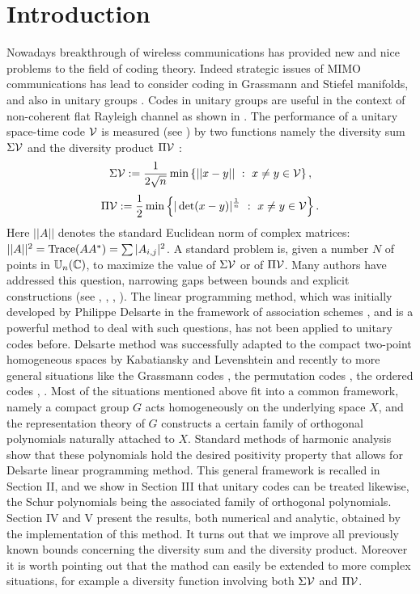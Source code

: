 \documentclass[10pt]{article}
\begin{document}
\section{Introduction}
Nowadays breakthrough of wireless communications has provided new and nice 
 problems to the field of coding theory. Indeed strategic issues of MIMO communications has
 lead to consider coding in Grassmann and Stiefel manifolds, and also
 in unitary groups \cite{TSE}.
 Codes in unitary groups  are useful in the context of non-coherent flat Rayleigh channel as shown
 in \cite{MARZETTA}. The performance of a unitary space-time code $\mathcal V$
 is measured  (see \cite{ROSEN}) by two functions namely the diversity sum $\Sigma \mathcal V$ and the 
 diversity product $\Pi \mathcal V$ : 
 \begin{eqnarray*}
 \Sigma \mathcal V := \frac{1}{2\sqrt{n}} \min \left \{ ||x-y||\ :
 \ x\ne y \in \mathcal V   \right\},
 \end{eqnarray*}
 \begin{eqnarray*}
 \Pi \mathcal V := \frac{1}{2} \min \left \{ |\det(x-y)|^{\frac 1 n}\ :
 \ x\ne y \in \mathcal V \right\}.
 \end{eqnarray*}
Here $||A||$ denotes the standard Euclidean norm of complex matrices: $||A||^2=\textrm{Trace}(AA^*)=\sum|A_{i,j}|^2$.
A standard problem is, given a  number $N$ of points in
$\mathbb{U}_n(\mathbb{C})$, to maximize the value of $\Sigma \mathcal V$ or of $\Pi \mathcal V$.
Many authors have addressed this question,
 narrowing gaps between bounds and explicit constructions (see
 \cite{ROSEN}, \cite{AB}, \cite{RECITE},  \cite{SHOKRO}). The
 linear programming method, which was initially developed by Philippe
 Delsarte in the framework of association schemes \cite{DELSARTE}, and
 is
 a powerful method to deal with such questions, has not been applied
 to unitary codes before.
 Delsarte method was successfully adapted to the compact two-point homogeneous
 spaces by Kabatiansky and Levenshtein \cite{LEVEN} and  recently to
 more general situations like the Grassmann codes \cite{CHRISTINE1},
 the permutation codes \cite{TARNANEN}, the ordered codes \cite{BARG},
 \cite{BIERBRAUER}. Most of the
 situations mentioned above fit into a common framework, namely a
 compact group $G$ acts homogeneously on the underlying space $X$, and the
 representation theory of $G$ constructs a certain family of orthogonal
 polynomials naturally attached to $X$. Standard methods of harmonic
 analysis show that these polynomials hold the desired positivity
 property that allows for Delsarte linear programming method. This
 general framework is recalled in Section II, and we show in  Section III
 that unitary codes can be treated likewise, the  Schur
 polynomials being the associated family of orthogonal
 polynomials. Section IV and V present the results, both numerical and
 analytic, obtained by the implementation of this method. 
 It turns out that we  improve all previously known bounds concerning the diversity sum and 
 the diversity product. Moreover it is worth pointing out that the mathod can easily be extended
 to more complex situations, for example a diversity function involving 
 both  $\Sigma \mathcal V$ and $\Pi \mathcal V$.\\
 
\end{document}
